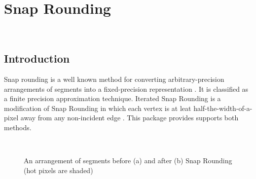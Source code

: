 
\ccParDims


\chapter{Snap Rounding}
\label{chapterSnapRoundibg}
\\
\newcommand{\reals}{{\rm I\!\hspace{-0.025em} R}}
\def\A{{\cal A}}
\def\S{{\cal S}}

\section{Introduction}
Snap rounding is a well known method for converting
arbitrary-precision arrangements of segments into a fixed-precision
representation \cite{gght-srlse-97, gm-rad-98, h-psifp-99}. It is classified as a finite precision approximation 
technique. Iterated Snap Rounding is a modification of Snap Rounding in
which each vertex is at leat half-the-width-of-a-pixel away from any
non-incident edge \cite{isr-2002}.
This package provides supports both methods.

\begin{figure}
\begin{center}
\  \
\end{center}
\vspace{-2ex}
\caption{An arrangement of segments before (a) and after (b)
Snap Rounding (hot pixels are shaded)}
\label{fig:sr1}
\end{figure}


